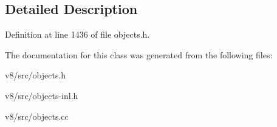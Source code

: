 \subsection{Detailed Description}


Definition at line 1436 of file objects.\+h.



The documentation for this class was generated from the following files\+:\begin{DoxyCompactItemize}
\item 
v8/src/objects.\+h\item 
v8/src/objects-\/inl.\+h\item 
v8/src/objects.\+cc\end{DoxyCompactItemize}
